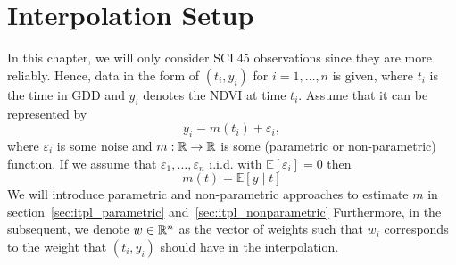 \section{Interpolation Setup}{\label{sec:itpl_setup}
	In this chapter, we will only consider SCL45 observations since they are more reliably. Hence, data in the form of $\left(t_{i}, y_{i}\right)$ for $i=1, \ldots, n$ is given, where $t_i$ is the time in GDD and $y_i$ denotes the NDVI at time $t_i$. Assume that it can be represented by
	$$
		y_{i}=m\left(t_{i}\right)+\varepsilon_{i},
	$$
	where $\varepsilon_i$ is some noise and $m: \mathbb{R} \rightarrow \mathbb{R}$ is some (parametric or non-parametric) function. If we assume that $\varepsilon_{1}, \ldots, \varepsilon_{n}$ i.i.d. with $\mathbb{E}\left[\varepsilon_{i}\right]=0$ then 
	$$
		m(t)=\mathbb{E}[y \mid t]
	$$
	We will introduce parametric and non-parametric approaches to estimate $m$ in section~\ref{sec:itpl_parametric} and~\ref{sec:itpl_nonparametric}
	Furthermore, in the subsequent, we denote $w\in \mathbb{R}^n$ as the vector of weights such that $w_i$ corresponds to the weight that $(t_i, y_i)$ should have in the interpolation. 
}







